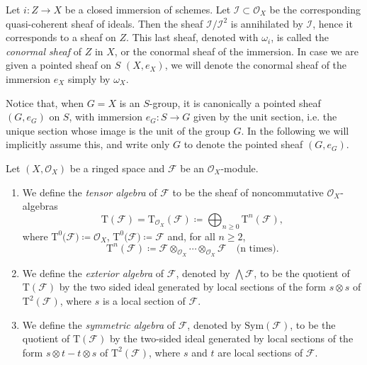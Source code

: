 \documentclass[../Main]{subfiles}
\begin{document}
\begin{defn}
	Let $i\colon Z \to X$ be a closed immersion of schemes.
	Let $\mathcal{I} \subset \mathcal{O}_X$ be the corresponding
	quasi-coherent sheaf of ideals.
	Then the sheaf $\mathcal{I}/\mathcal{I}^2$ is annihilated by $\mathcal{I}$,
	hence it corresponds to a sheaf on $Z$.
	This last sheaf, denoted with $\omega_i$, is called the {\em conormal
	sheaf} of $Z$ in $X$, or the conormal sheaf of the immersion.
	In case we are given a pointed sheaf on $S$ $\left(X, e_X\right)$, we will denote 
	the conormal sheaf of the immersion $e_X$ simply by
	$\omega_X$.
\end{defn}


\begin{rem}[]
	Notice that, when $G = X$ is an $S$-group, it is canonically a
	pointed sheaf $\left(G, e_G\right)$ on $S$, with immersion $e_G\colon S \to G$
	given by the unit section, i.e. the unique section whose image
	is the unit of the group $G$.
	In the following we will implicitly assume this, and write only
	$G$ to denote the pointed sheaf $(G, e_G)$.
\end{rem}


\begin{defn}
	Let $( X , \mathcal{O}_{ X } )$ be a ringed space and $\mathcal{F}$ be an
	$\mathcal{O}_{ X }$-module.
\begin{enumerate}
	\item We define the {\em tensor algebra} of $\mathcal{F}$ to be the sheaf of
		noncommutative $\mathcal{O}_{ X }$-algebras
		\begin{equation*}
			\mathrm{T}(\mathcal{F}) = 
			\mathrm{T}_{\mathcal{O}_{ X }}(\mathcal{F}) \coloneqq
			\bigoplus_{n \geq 0} \mathrm{T}^n(\mathcal{F})
		,\end{equation*}
		where $\mathrm{T}^0(\mathcal{F)} \coloneqq \mathcal{O}_{ X }$,
		$\mathrm{T}^0(\mathcal{F)} \coloneqq \mathcal{F}$ and,
		for all $n \geq 2$,
		\begin{equation*}
			\mathrm{T}^n(\mathcal{F}) \coloneqq 
			\mathcal{F} \otimes_{\mathcal{O}_{ X }} \cdots \otimes_{\mathcal{O}_{ X }}
			\mathcal{F}
			\quad \text{(n times)}
		.\end{equation*}
	
	\item We define the {\em exterior algebra} of $\mathcal{F}$, 
		denoted by $\bigwedge \mathcal{F}$, to be the quotient of
		$\mathrm{T}(\mathcal{F})$ by the two sided ideal
		generated by local sections of the form
		$s \otimes s$ of $\mathrm{T}^2(\mathcal{F})$,
		where $s$ is a local section of $\mathcal{F}$.

	\item We define the {\em symmetric algebra} of $\mathcal{F}$,
		denoted by $\mathrm{Sym}(\mathcal{F})$, to be the quotient 
		of $\mathrm{T}(\mathcal{F})$ by the two-sided ideal
		generated by local sections of the form
		$s \otimes t - t \otimes s$ of $\mathrm{T}^2(\mathcal{F})$,
		where $s$ and $t$ are local sections of $\mathcal{F}$.
\end{enumerate}
\end{defn}
\end{document}
